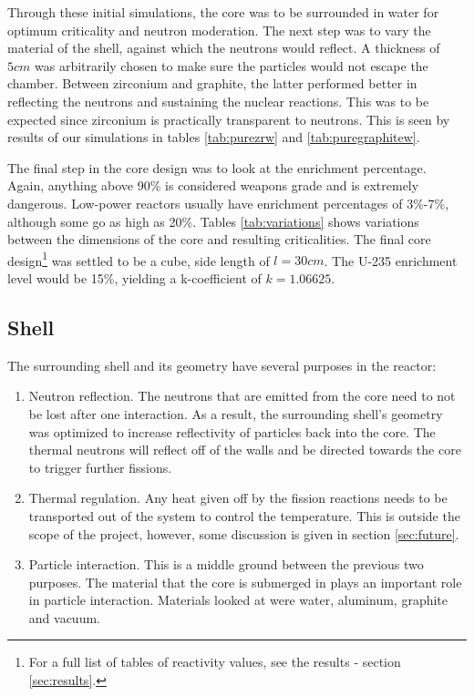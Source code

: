 Through these initial simulations, the core was to be surrounded in water for optimum criticality and neutron moderation. The next step was to vary the material of the shell, against which the neutrons would reflect. A thickness of $5cm$ was arbitrarily chosen to make sure the particles would not escape the chamber. Between zirconium and graphite, the latter performed better in reflecting the neutrons and sustaining the nuclear reactions. This was to be expected since zirconium is practically transparent to neutrons. This is seen by results of our simulations in tables \ref{tab:purezrw} and \ref{tab:puregraphitew}.

The final step in the core design was to look at the enrichment percentage. Again, anything above 90\% is considered weapons grade and is extremely dangerous. Low-power reactors usually have enrichment percentages of 3\%-7\%, although some go as high as 20\%. Tables \ref{tab:variations} shows variations between the dimensions of the core and resulting criticalities. The final core design\footnote{For a full list of tables of reactivity values, see the results - section \ref{sec:results}.} was settled to be a cube, side length of $l=30cm$. The U-235 enrichment level would be 15\%, yielding a k-coefficient of $k=1.06625$.

\subsection{Shell}

The surrounding shell and its geometry have several purposes in the reactor:

\begin{enumerate}
	\item Neutron reflection. The neutrons that are emitted from the core need to not be lost after one interaction. As a result, the surrounding shell's geometry was optimized to increase reflectivity of particles back into the core. The thermal neutrons will reflect off of the walls and be directed towards the core to trigger further fissions.
	\item Thermal regulation. Any heat given off by the fission reactions needs to be transported out of the system to control the temperature. This is outside the scope of the project, however, some discussion is given in section \ref{sec:future}.
	\item Particle interaction. This is a middle ground between the previous two purposes. The material that the core is submerged in plays an important role in particle interaction. Materials looked at were water, aluminum, graphite and vacuum.
\end{enumerate}

